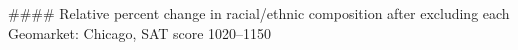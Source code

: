 #### Relative percent change in racial/ethnic composition after excluding each Geomarket: Chicago, SAT score 1020–1150
